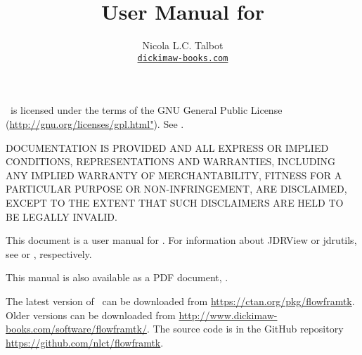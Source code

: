 \newcommand*{\typedef}[1]{\inlineglsdef{ajdr-format.#1}}
\newcommand*{\type}[1]{\gls{ajdr-format.#1}}
\newcommand*{\typepl}[1]{\glspl{ajdr-format.#1}}


%
{}
{}


\title{User Manual for \FlowframTk}
\author{Nicola L.C. Talbot\\\href{https://www.dickimaw-books.com/}{\nolinkurl{dickimaw-books.com}}}

\subtitle{\bigskip{}\bigskip}


\GlsXtrLoadResources[src={flowframtk,shared,\langbibsrcs},
 \TeXJavaHelpSymbolResourceOptions
]

\GlsXtrLoadResources[src={flowframtk,shared,\langbibsrcs},
 \TeXJavaHelpGlsResourceOptions
]


\maketitle

\FlowframTk\ is licensed under the terms of the GNU General Public License
(\url{http://gnu.org/licenses/gpl.html"}).
See .

DOCUMENTATION IS PROVIDED  AND ALL EXPRESS OR IMPLIED
CONDITIONS, REPRESENTATIONS AND WARRANTIES, INCLUDING ANY
IMPLIED WARRANTY OF MERCHANTABILITY, FITNESS FOR A PARTICULAR
PURPOSE OR NON-INFRINGEMENT, ARE DISCLAIMED, EXCEPT TO THE EXTENT THAT
SUCH DISCLAIMERS ARE HELD TO BE LEGALLY INVALID.

This document is a user manual for \FlowframTk. For information about
JDRView or jdrutils, see  or
, respectively.

\IfTeXParserLib
  {%
    This manual is also available as a PDF document, . 
  }
  {}

The latest version of \FlowframTk\ can be downloaded from
\url{https://ctan.org/pkg/flowframtk}.
Older versions can be downloaded from
\url{http://www.dickimaw-books.com/software/flowframtk/}.
The source code is in the GitHub repository
\url{https://github.com/nlct/flowframtk}.

